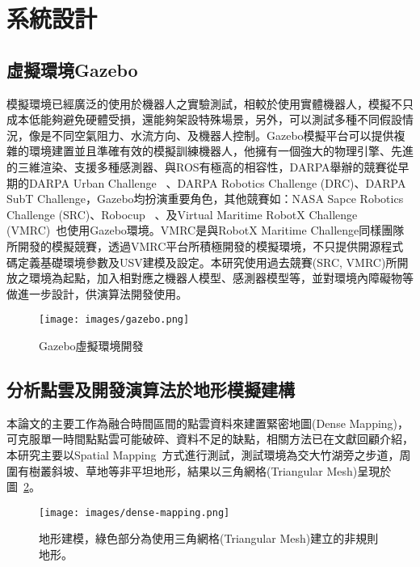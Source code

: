 \section{系統設計}

\subsection{虛擬環境Gazebo}

模擬環境已經廣泛的使用於機器人之實驗測試，相較於使用實體機器人，模擬不只成本低能夠避免硬體受損，還能夠架設特殊場景，另外，可以測試多種不同假設情況，像是不同空氣阻力、水流方向、及機器人控制。Gazebo模擬平台可以提供複雜的環境建置並且準確有效的模擬訓練機器人，他擁有一個強大的物理引擎、先進的三維渲染、支援多種感測器、與ROS有極高的相容性，DARPA舉辦的競賽從早期的DARPA Urban Challenge ~\cite{ozguner2008simulation}、DARPA Robotics Challenge (DRC)、DARPA SubT Challenge，Gazebo均扮演重要角色，其他競賽如：NASA Sapce Robotics Challenge (SRC)、Robocup ~\cite{laue2005simrobot}、及Virtual Maritime RobotX Challenge (VMRC)~\cite{vmrc}也使用Gazebo環境。VMRC是與RobotX Maritime Challenge同樣團隊所開發的模擬競賽，透過VMRC平台所積極開發的模擬環境，不只提供開源程式碼定義基礎環境參數及USV建模及設定。本研究使用過去競賽(SRC, VMRC)所開放之環境為起點，加入相對應之機器人模型、感測器模型等，並對環境內障礙物等做進一步設計，供演算法開發使用。

\begin{figure}[h] %
\texttt{[image: images/gazebo.png]}
\centering
\caption{Gazebo虛擬環境開發}
 \label{figure:gazebo}
\end{figure}

\subsection{分析點雲及開發演算法於地形模擬建構}

本論文的主要工作為融合時間區間的點雲資料來建置緊密地圖(Dense Mapping)，可克服單一時間點點雲可能破碎、資料不足的缺點，相關方法已在文獻回顧介紹，本研究主要以Spatial Mapping~\cite{zed-spatial-mapping}方式進行測試，測試環境為交大竹湖旁之步道，周圍有樹叢斜坡、草地等非平坦地形，結果以三角網格(Triangular Mesh)呈現於圖~\ref{figure:dense-mapping}。

\begin{figure}[h] %
\texttt{[image: images/dense-mapping.png]}
\centering
\caption{地形建模，綠色部分為使用三角網格(Triangular Mesh)建立的非規則地形。}
 \label{figure:dense-mapping}
\end{figure}

